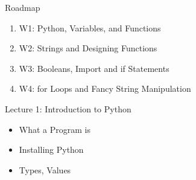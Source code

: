 \documentclass[14 pt]{beamer}
\let\olditem\item
\renewcommand{\item}{\olditem\vspace{4pt}}
\newcommand{\Alert}[1]{\textcolor{Alert}{#1}} %
\begin{document}

\begin{frame}{Roadmap}
  \begin{enumerate}
[circle]
  \item \Alert{W1: Python, Variables, and Functions}
  \item W2: Strings and Designing Functions
  \item W3: Booleans, Import and if Statements
  \item W4: for Loops and Fancy String Manipulation
  \end{enumerate}
  \begin{block}{Lecture 1: Introduction to Python}
      \begin{itemize}
  \item What a Program is
  \item  Installing Python
  \item Types, Values
  \end{itemize}
  \end{block}
\end{frame}
\end{document}
